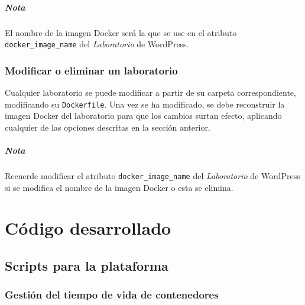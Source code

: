                 \paragraph{Nota}

                    El nombre de la imagen Docker será la que se use en el atributo \texttt{docker\_image\_name} del \textit{Laboratorio} de WordPress.

        \subsection{Modificar o eliminar un laboratorio}

            Cualquier laboratorio se puede modificar a partir de su carpeta correspondiente, modificando su \texttt{Dockerfile}. Una vez se ha modificado, se debe reconstruir la imagen Docker del laboratorio para que los cambios surtan efecto, aplicando cualquier de las opciones descritas en la sección anterior.

            \paragraph{Nota}

                Recuerde modificar el atributo \texttt{docker\_image\_name} del \textit{Laboratorio} de WordPress si se modifica el nombre de la imagen Docker o esta se elimina.

                \cleardoublepage

            

\chapter{Código desarrollado}

    \section{Scripts para la plataforma}

        \subsection{Gestión del tiempo de vida de contenedores}
            
